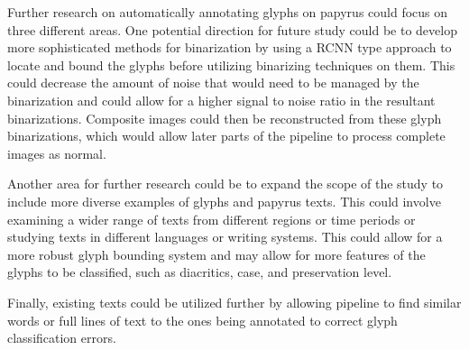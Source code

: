 
Further research on automatically annotating glyphs on papyrus could focus on three different areas. One potential direction for future study could be to develop more sophisticated methods for binarization by using a RCNN type approach to locate and bound the glyphs before utilizing binarizing techniques on them. This could decrease the amount of noise that would need to be managed by the binarization and could allow for a higher signal to noise ratio in the resultant binarizations. Composite images could then be reconstructed from these glyph binarizations, which would allow later parts of the pipeline to process complete images as normal.

Another area for further research could be to expand the scope of the study to include more diverse examples of glyphs and papyrus texts. This could involve examining a wider range of texts from different regions or time periods or studying texts in different languages or writing systems. This could allow for a more robust glyph bounding system and may allow for more features of the glyphs to be classified, such as diacritics, case, and preservation level.

Finally, existing texts could be utilized further by allowing pipeline to find similar words or full lines of text to the ones being annotated to correct glyph classification errors.
